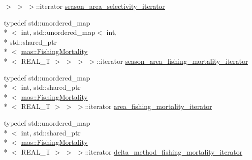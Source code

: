 \begin{DoxyCompactItemize}
 $>$ $>$ $>$\-::iterator \hyperlink{structmas_1_1_fleet_af276dbe3918638c6bc4556bd97330939}{season\-\_\-area\-\_\-selectivity\-\_\-iterator}
\item 
typedef std\-::unordered\-\_\-map\\*
$<$ int, std\-::unordered\-\_\-map$<$ int, \\*
std\-::shared\-\_\-ptr\\*
$<$ \hyperlink{structmas_1_1_fishing_mortality}{mas\-::\-Fishing\-Mortality}\\*
$<$ R\-E\-A\-L\-\_\-\-T $>$ $>$ $>$ $>$\-::iterator \hyperlink{structmas_1_1_fleet_aab7bbd15fe8e99db584f6d936c028bf3}{season\-\_\-area\-\_\-fishing\-\_\-mortality\-\_\-iterator}
\item 
typedef std\-::unordered\-\_\-map\\*
$<$ int, std\-::shared\-\_\-ptr\\*
$<$ \hyperlink{structmas_1_1_fishing_mortality}{mas\-::\-Fishing\-Mortality}\\*
$<$ R\-E\-A\-L\-\_\-\-T $>$ $>$ $>$\-::iterator \hyperlink{structmas_1_1_fleet_a72800f7ad0b8ec91f129bd8020c19912}{area\-\_\-fishing\-\_\-mortality\-\_\-iterator}
\item 
typedef std\-::unordered\-\_\-map\\*
$<$ int, std\-::shared\-\_\-ptr\\*
$<$ \hyperlink{structmas_1_1_fishing_mortality}{mas\-::\-Fishing\-Mortality}\\*
$<$ R\-E\-A\-L\-\_\-\-T $>$ $>$ $>$\-::iterator \hyperlink{structmas_1_1_fleet_a446379b7a809ae7e2dd208c577e87a20}{delta\-\_\-method\-\_\-fishing\-\_\-mortality\-\_\-iterator}
\end{DoxyCompactItemize}
